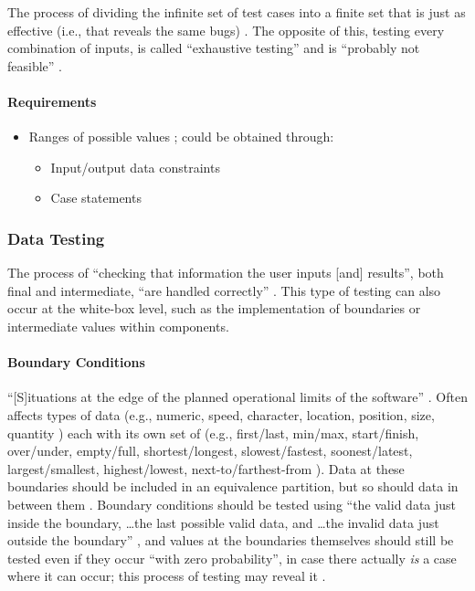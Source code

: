 The process of dividing the infinite set of test cases into a finite set that is
just as effective (i.e., that reveals the same bugs) \citep[p.~67]{Patton2006}.
The opposite of this, testing every combination of inputs, is called
``exhaustive testing'' and is ``probably not feasible'' \exhInfCite{}.

\paragraph{Requirements}
\begin{itemize}
      \item Ranges of possible values \citep[p.~67]{Patton2006};
            could be obtained through:
            \begin{itemize}
                  \item Input/output data constraints
                  \item Case statements
            \end{itemize}
\end{itemize}

\subsubsection{Data Testing \citep[pp.~70-79]{Patton2006}}

The process of ``checking that information the user inputs [and] results'',
both final and intermediate, ``are handled correctly''
\citep[p.~70]{Patton2006}. This type of testing can also occur at the
white-box level, such as the implementation of boundaries
\citep[p.~431]{vanVliet2000} or intermediate values within
components.

\paragraph{Boundary Conditions \citep[pp.~70-74]{Patton2006}}

``[S]ituations at the edge of the planned operational limits of the software''
\citep[p.~72]{Patton2006}. Often affects types of data (e.g., numeric,
speed, character, location, position, size, quantity
\citep[p.~72]{Patton2006}) each with its own set of (e.g., first/last,
min/max, start/finish, over/under, empty/full, shortest/longest,
slowest/fastest, soonest/latest, largest/smallest, highest/lowest,
next-to/farthest-from \citep[pp.~72-73]{Patton2006}). Data at these
boundaries should be included in an equivalence partition, but so should
data in between them \citep[p.~73]{Patton2006}. Boundary conditions
should be tested using ``the valid data just inside the boundary,
\dots the last possible valid data, and \dots the invalid data just outside the
boundary'' \citep[p.~73]{Patton2006}, and values at the boundaries
themselves should still be tested even if they occur ``with zero probability'',
in case there actually \emph{is} a case where it can occur; this process of
testing may reveal it \citep[p.~460]{PetersAndPedrycz2000}.

